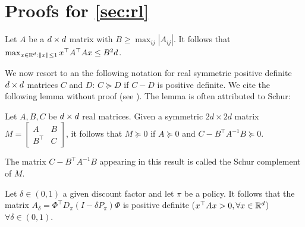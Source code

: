 \section{Proofs for \cref{sec:rl}}

\begin{lemma}\label{lm:matnorm}
Let $A$ be a $d \times d$ matrix with $B\ge \max_{ij}\left|A_{ij}\right|$. It follows that $\max_{x\in \mathbb{R}^d: \left\| x\right\|\leq1}x^\top A^\top A x \le B^2d$.
\end{lemma}

We now resort to an the following notation for real symmetric positive definite $d \times d$ matrices $C$ and $D$: $C\succeq D$ if $C-D$ is positive definite. We cite the following lemma without proof (see \cite{schur}). The lemma is often attributed to Schur: 
\begin{lemma}\label{lm:schur}
Let $A,B,C$ be $d \times d$ real matrices. 
Given a symmetric $2d\times 2d$  matrix $M=\left[\begin{matrix}A&B \\B^\top &C\end{matrix}\right]$, it follows that $M\succeq 0$ if	$A\succeq 0$ and  $C-B^\top A^{-1}B\succeq 0$.
\end{lemma}
The matrix  $C-B^\top A^{-1}B$ appearing in this result is called the Schur complement of $M$.
\begin{lemma}\label{lm:amat}
Let $\delta\in(0,1)$ a given discount factor and let $\pi$ be a policy. It follows that the matrix $A_\delta=\Phi^\top D_\pi(I-\delta P_\pi)\Phi$ is positive definite ($x^\top Ax>0,\forall x \in \mathbb{R}^d$) $\forall \delta\in(0,1)$.
\end{lemma}
\fi

